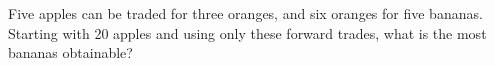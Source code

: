 Five apples can be traded for three oranges, and six oranges for five bananas. Starting with 20 apples and using only these forward trades, what is the most bananas obtainable?
